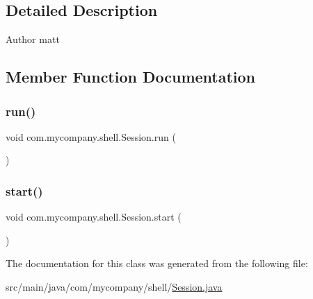 \subsection{Detailed Description}
\begin{DoxyAuthor}{Author}
matt 
\end{DoxyAuthor}


\subsection{Member Function Documentation}
\mbox{\label{classcom_1_1mycompany_1_1shell_1_1Session_a7709b9accbec70e0beb28721eaea3994}} 
\subsubsection{\texorpdfstring{run()}{run()}}
{\footnotesize\ttfamily void com.\+mycompany.\+shell.\+Session.\+run (\begin{DoxyParamCaption}{ }\end{DoxyParamCaption})\hspace{0.3cm}{\ttfamily [inline]}}

\mbox{\label{classcom_1_1mycompany_1_1shell_1_1Session_a5947495d51dd40ded3d116a9bf379bad}} 
\subsubsection{\texorpdfstring{start()}{start()}}
{\footnotesize\ttfamily void com.\+mycompany.\+shell.\+Session.\+start (\begin{DoxyParamCaption}{ }\end{DoxyParamCaption})\hspace{0.3cm}{\ttfamily [inline]}}



The documentation for this class was generated from the following file\+:\begin{DoxyCompactItemize}
\item 
src/main/java/com/mycompany/shell/\hyperlink{Session_8java}{Session.\+java}\end{DoxyCompactItemize}
